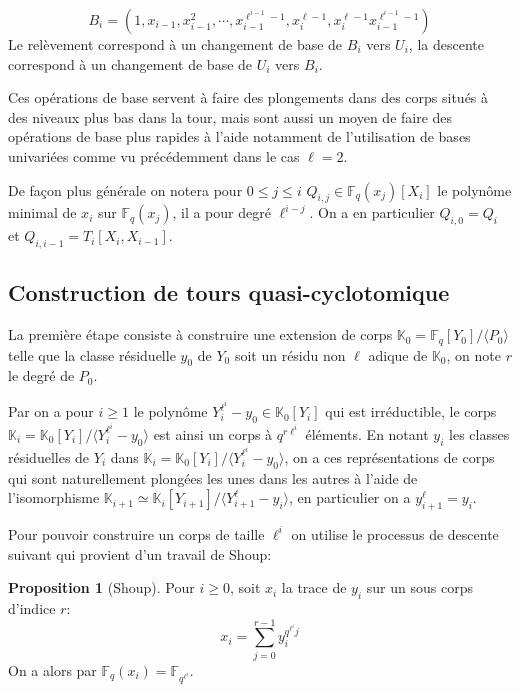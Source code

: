 \documentclass[10pt,a4paper]{book}
\theoremstyle{plain}
\theoremstyle{definition}
\theoremstyle{definition}
\theoremstyle{definition}
\newtheorem{prop}[thm]{Proposition}
\theoremstyle{definition}
\theoremstyle{remark}
\theoremstyle{remark}
\begin{document}
\[
B_i=(1,x_{i-1},x_{i-1}^2,\cdots,x_{i-1}^{\ell^{i-1}-1},x_i^{\ell-1},x_i^{\ell-1}x_{i-1}^{\ell^{i-1}-1})
\] 
Le relèvement correspond à un changement de base de $B_i$ vers $U_i$, la descente correspond à un changement de base de $U_i$ vers $B_i$.

Ces opérations de base servent à faire des plongements dans des corps situés à des niveaux plus bas dans la tour, mais sont aussi un moyen de faire des opérations de base plus rapides à l'aide notamment de l'utilisation de bases univariées comme vu précédemment dans le cas $\ell=2$.

De façon plus générale on notera pour $0 \leqslant j \leqslant i $ $Q_{i,j} \in \mathbb{F}_q(x_j)[X_i]$ le polynôme minimal de $x_i$ sur $\mathbb{F}_{q}(x_j)$, il a pour degré $\ell^{i-j}$. On a en particulier $Q_{i,0}=Q_i$ et $Q_{i,i-1}=T_{i}[X_i,X_{i-1}]$.

\subsection{Construction de tours quasi-cyclotomique}
La première étape consiste à construire une extension de corps $\mathbb{K}_0=\mathbb{F}_q[Y_0]/\langle P_0 \rangle$ telle que la classe résiduelle $y_0$ de $Y_0$ soit un résidu non $\ell$ adique de $\mathbb{K}_0$, on note $r$ le degré de $P_0$.

Par \cite[Th. VI.9.1]{Lang2002algebra} on a pour $i \geqslant 1$ le polynôme $Y_i^{\ell^i}-y_0 \in \mathbb{K}_0[Y_i]$ qui est irréductible, le corps $\mathbb{K}_i=\mathbb{K}_0[Y_i]/\langle Y_i^{\ell^i}-y_0 \rangle$ est ainsi un corps à $q^{r\ell^i}$ éléments. En notant $y_i$ les classes résiduelles de $Y_i$ dans $\mathbb{K}_i=\mathbb{K}_0[Y_i]/\langle Y_i^{\ell^i}-y_0 \rangle$, on a ces représentations de corps qui sont naturellement plongées les unes dans les autres à l'aide de l'isomorphisme $\mathbb{K}_{i+1} \simeq \mathbb{K}_i[Y_{i+1}]/\langle Y_{i+1}^{\ell}-y_i\rangle $, en particulier on a $y_{i+1}^{\ell}=y_i$.


 Pour pouvoir construire un corps de taille $\ell^i$ on utilise le processus de descente suivant qui provient d'un  travail de Shoup:

\begin{prop}[Shoup]
Pour $i \geqslant 0$, soit $x_i$ la trace de $y_i$ sur un sous corps d'indice $r$:
\begin{equation*}
x_i=\sum_{j=0}^{r-1}y_i^{q^{\ell^i}j}
\end{equation*}
On a alors par \cite[Th. 2.1]{Shoup88} $\mathbb{F}_q(x_i)=\mathbb{F}_{q^{\ell^i}}$.
\end{prop}
\end{document}
